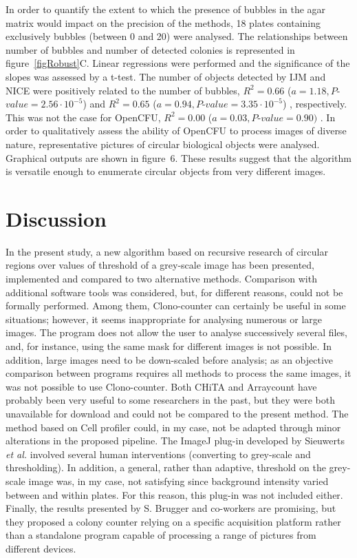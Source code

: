 \documentclass[10pt]{article}
\newcommand{\IJM}{IJM}
\newcommand{\BubbleNoiseOCFU}{$R^2 = 0.00$ ($a=0.03, P$-$value=0.90)$ }
\newcommand{\BubbleNoiseNICE}{$R^2 = 0.65$ ($a=0.94, P$-$value=3.35\cdot 10^{-5}$) }
\newcommand{\BubbleNoiseIJM}{$R^2 = 0.66$ ($a=1.18, P$-$value=2.56\cdot 10^{-5}$) }
\begin{document}
In order to quantify the extent to which the presence of bubbles in the agar matrix would impact on
the precision of the methods, 18 plates containing exclusively bubbles (between
0 and 20) were analysed. The relationships between number of bubbles and number
of detected colonies is represented in figure~\ref{figRobust}C. Linear
regressions were performed and the significance of the slopes was assessed by a
t-test. The number of objects detected by \IJM{} and NICE were positively
related to the number of bubbles, \BubbleNoiseIJM and \BubbleNoiseNICE, respectively.
This was not the case for OpenCFU, \BubbleNoiseOCFU.
In order to qualitatively assess the ability of OpenCFU to process images of diverse nature,
representative pictures of circular biological objects were analysed. 
Graphical outputs are shown 
in figure~6.
These results suggest
that the algorithm is versatile enough to 
enumerate circular objects from very different images.




\section*{Discussion}
In the present study, a new algorithm based on recursive research of circular
regions over values of threshold of a grey-scale image has been presented, implemented and compared to two alternative methods\cite{clarke_lowcost_2010,cai_optimized_2011}. 
Comparison with additional software tools was considered, but, for different reasons, could not be formally performed.
Among them, Clono-counter \cite{niyazi_counting_2007}
can certainly be useful in some situations; however, it seems inappropriate for analysing numerous or large images.  
The program does not allow the user to analyse successively several files, and, for instance, using
the same mask for different images is not possible.
In addition, large images need to be down-scaled before analysis; 
as an objective comparison between programs requires all methods to process the same images,
it was not possible to use Clono-counter.
Both CHiTA\cite{bewes_automated_2008} and Arraycount\cite{kachouie_arraycount_2009} 
have probably been very useful to some researchers in the past, but
they were both unavailable for download and could not be compared to the present
method.
The method based on Cell profiler \cite {vokes_using_2008} could, in my case, not be adapted through minor
alterations in the proposed pipeline.
The ImageJ plug-in developed by Sieuwerts \emph{et al.} \cite{sieuwerts_simple_2008}
involved several human
interventions (converting to grey-scale and thresholding).
In addition, a general, rather than adaptive, threshold on the grey-scale image was, in my case, 
not satisfying since background intensity varied between and within plates.
For this reason, this plug-in was not included either.
Finally, the results presented by S. Brugger and co-workers \cite{brugger_automated_2012}
are promising, but they proposed a colony counter relying on a specific
acquisition platform rather than a standalone program capable of processing a range of 
pictures from different devices.
\end{document}
